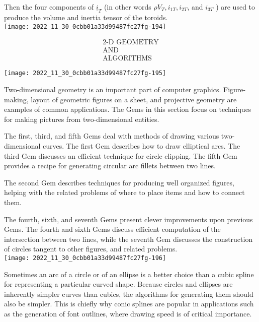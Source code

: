 Then the four components of $\underline{i}_{T}$ (in other words $\rho V_{T}, i_{1 T}, i_{2 T}$, and $i_{3 T}$ ) are used to produce the volume and inertia tensor of the toroids.\\
\texttt{[image: 2022\_11\_30\_0cbb01a33d99487fc27fg-194]}

$$
\begin{gathered}
\text { 2-D GEOMETRY } \\
\text { AND } \\
\text { ALGORITHMS }
\end{gathered}
$$

\begin{center}
\texttt{[image: 2022\_11\_30\_0cbb01a33d99487fc27fg-195]}
\end{center}

Two-dimensional geometry is an important part of computer graphics. Figure-making, layout of geometric figures on a sheet, and projective geometry are examples of common applications. The Gems in this section focus on techniques for making pictures from two-dimensional entities.

The first, third, and fifth Gems deal with methods of drawing various two-dimensional curves. The first Gem describes how to draw elliptical arcs. The third Gem discusses an efficient technique for circle clipping. The fifth Gem provides a recipe for generating circular arc fillets between two lines.

The second Gem describes techniques for producing well organized figures, helping with the related problems of where to place items and how to connect them.

The fourth, sixth, and seventh Gems present clever improvements upon previous Gems. The fourth and sixth Gems discuss efficient computation of the intersection between two lines, while the seventh Gem discusses the construction of circles tangent to other figures, and related problems.\\
\texttt{[image: 2022\_11\_30\_0cbb01a33d99487fc27fg-196]}

Sometimes an arc of a circle or of an ellipse is a better choice than a cubic spline for representing a particular curved shape. Because circles and ellipses are inherently simpler curves than cubics, the algorithms for generating them should also be simpler. This is chiefly why conic splines are popular in applications such as the generation of font outlines, where drawing speed is of critical importance.

